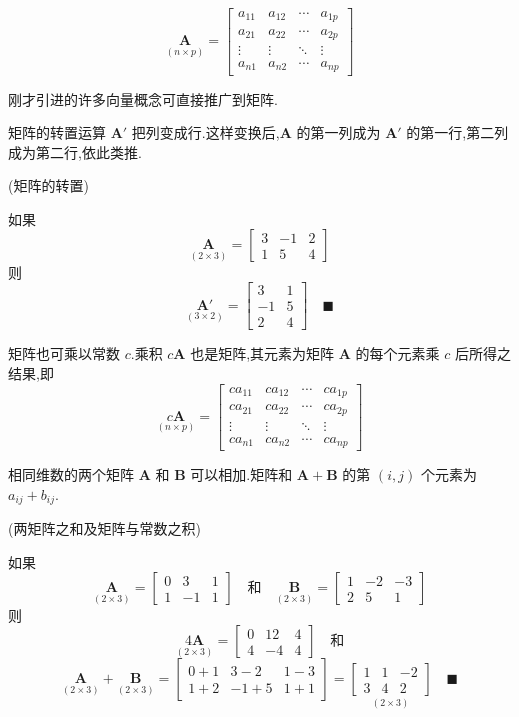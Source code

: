 
\[
\underset{(n\times p)}{\bm{A}} =
\begin{bmatrix}
a_{11} & a_{12} & \cdots & a_{1p} \\
a_{21} & a_{22} & \cdots & a_{2p} \\
\vdots & \vdots & \ddots & \vdots \\
a_{n1} & a_{n2} & \cdots & a_{np}
\end{bmatrix}
\]

刚才引进的许多向量概念可直接推广到矩阵.

矩阵的转置运算 $\bm{A}'$ 把列变成行.这样变换后,$\bm{A}$ 的第一列成为 $\bm{A}'$ 的第一行,第二列成为第二行,依此类推.

\quad (矩阵的转置)

如果
\[
\underset{(2\times 3)}{\bm{A}} =
\begin{bmatrix}
3 & -1 & 2 \\
1 & 5 & 4
\end{bmatrix}
\]
则
\[
\underset{(3\times 2)}{\bm{A}'} =
\begin{bmatrix}
3 & 1 \\
-1 & 5 \\
2 & 4
\end{bmatrix}
\quad\blacksquare
\]

矩阵也可乘以常数 $c$.乘积 $c\bm{A}$ 也是矩阵,其元素为矩阵 $\bm{A}$ 的每个元素乘 $c$ 后所得之结果,即
\[
\underset{(n\times p)}{c\bm{A}} =
\begin{bmatrix}
ca_{11} & ca_{12} & \cdots & ca_{1p} \\
ca_{21} & ca_{22} & \cdots & ca_{2p} \\
\vdots & \vdots & \ddots & \vdots \\
ca_{n1} & ca_{n2} & \cdots & ca_{np}
\end{bmatrix}
\]

相同维数的两个矩阵 $\bm{A}$ 和 $\bm{B}$ 可以相加.矩阵和 $\bm{A}+\bm{B}$ 的第 $(i,j)$ 个元素为 $a_{ij}+b_{ij}$.

\quad (两矩阵之和及矩阵与常数之积)

如果
\[
\underset{(2\times 3)}{\bm{A}} =
\begin{bmatrix}
0 & 3 & 1 \\
1 & -1 & 1
\end{bmatrix}
\quad\text{和}\quad
\underset{(2\times 3)}{\bm{B}} =
\begin{bmatrix}
1 & -2 & -3 \\
2 & 5 & 1
\end{bmatrix}
\]
则
\[
\underset{(2\times 3)}{4\bm{A}} =
\begin{bmatrix}
0 & 12 & 4 \\
4 & -4 & 4
\end{bmatrix}
\quad\text{和}
\]
\[
\underset{(2\times 3)}{\bm{A}} + \underset{(2\times 3)}{\bm{B}} =
\begin{bmatrix}
0+1 & 3-2 & 1-3 \\
1+2 & -1+5 & 1+1
\end{bmatrix}
=
\underset{(2\times 3)}{\begin{bmatrix}
1 & 1 & -2 \\
3 & 4 & 2
\end{bmatrix}}
\quad\blacksquare
\]

